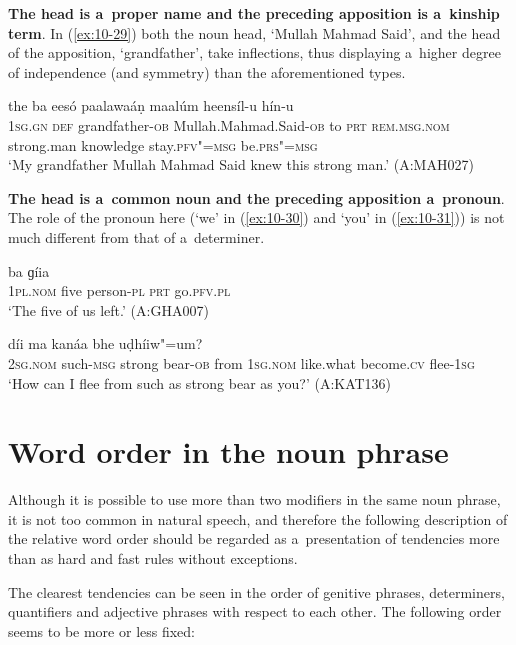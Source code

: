 \textbf{The head is a~proper name and the preceding apposition is a~kinship term}. In (\ref{ex:10-29}) both the noun head, `Mullah Mahmad Said', and the head of the apposition, `grandfather', take inflections, thus displaying a~higher degree of independence (and symmetry) than the aforementioned types. 

\begin{exe}
\ex
\label{ex:10-29}
\gll [míi se dóod-a mulaa"=mhaamad"=seed-á] the ba eesó paalawaáṇ maalúm heensíl-u hín-u \\
\textsc{1sg.gn} \textsc{def} grandfather-\textsc{ob} Mullah.Mahmad.Said-\textsc{ob} to  \textsc{prt} \textsc{rem.msg.nom} strong.man knowledge  stay.\textsc{pfv"=msg} be.\textsc{prs"=msg}  \\
\glt `My grandfather Mullah Mahmad Said knew this strong man.' (A:MAH027)
\end{exe}


\textbf{The head is a~common noun and the preceding apposition a~pronoun}. The role of the pronoun here (`we' in (\ref{ex:10-30}) and `you' in (\ref{ex:10-31})) is not much different from that of a~determiner. 

\begin{exe}
\ex
\label{ex:10-30}
 ba ɡíia \\
\textsc{1pl.nom} five person-\textsc{pl} \textsc{prt} go.\textsc{pfv.pl}  \\
\glt `The five of us left.' (A:GHA007)

\ex
\label{ex:10-31}
 díi ma kanáa bhe uḍhíiw"=um? \\
\textsc{2sg.nom} such-\textsc{msg} strong bear-\textsc{ob} from \textsc{1sg.nom}  like.what become.\textsc{cv} flee-\textsc{1sg} \\
\glt `How can I flee from such as strong bear as you?' (A:KAT136)
\end{exe}

\section{Word order in the noun phrase}
\label{sec:10-2}


Although it is possible to use more than two modifiers in the same noun phrase, it is not too common in natural speech, and therefore the following description of the relative word order should be regarded as a~presentation of tendencies more than as hard and fast rules without exceptions. 


The clearest tendencies can be seen in the order of genitive phrases, determiners, quantifiers and adjective phrases with respect to each other. The following order seems to be more or less fixed:


